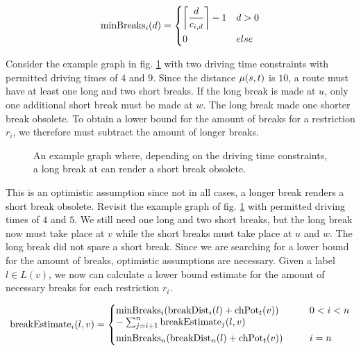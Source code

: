 \begin{align}\label{eq:min_breaks_n}
	\minBreaks_i(d) = \begin{dcases}
		\ceil*{ \frac{d}{\restr_{i,d}} } - 1 & d > 0 \\
		0                                    & else
	\end{dcases}
\end{align}

Consider the example graph in fig. \ref{fig:graph_short_long_break} with two driving time constraints with permitted driving times of $4$ and $9$. Since the distance $\distance(s,t)$ is $10$, a route must have at least one long and two short breaks. If the long break is made at $u$, only one additional short break must be made at $w$. The long break made one shorter break obsolete. To obtain a lower bound for the amount of breaks for a restriction $r_i$, we therefore must subtract the amount of longer breaks.

\begin{figure}[hbtp]
	\centering
	
	\caption{An example graph where, depending on the driving time constraints, a long break at can render a short break obsolete.}
	\label{fig:graph_short_long_break}
\end{figure}

This is an optimistic assumption since not in all cases, a longer break renders a short break obsolete. Revisit the example graph of fig. \ref{fig:graph_short_long_break} with permitted driving times of $4$ and $5$. We still need one long and two short breaks, but the long break now must take place at $v$ while the short breaks must take place at $u$ and $w$. The long break did not spare a short break. Since we are searching for a lower bound for the amount of breaks, optimistic assumptions are necessary. Given a label $l \in L(v)$, we now can calculate a lower bound estimate for the amount of necessary breaks for each restriction $r_i$.

\begin{align}\label{eq:number_breaks_sum}
	\breakEstimate_i(l,v)  =\begin{dcases}
		\parbox[t]{.55\textwidth}{$\minBreaks_i(\breakDist_i(l) + \chpotential_t(v)) \\- \sum_{j=i+1}^{n}{\breakEstimate_j(l,v) }$} & 0 < i < n \\
		\minBreaks_n(\breakDist_n(l) + \chpotential_t(v)) & i=n
	\end{dcases}
\end{align}

